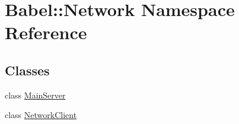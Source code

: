 \hypertarget{namespaceBabel_1_1Network}{}\section{Babel\+:\+:Network Namespace Reference}
\label{namespaceBabel_1_1Network}
\subsection*{Classes}
\begin{DoxyCompactItemize}
\item 
class \hyperlink{classBabel_1_1Network_1_1MainServer}{Main\+Server}
\item 
class \hyperlink{classBabel_1_1Network_1_1NetworkClient}{Network\+Client}
\end{DoxyCompactItemize}
